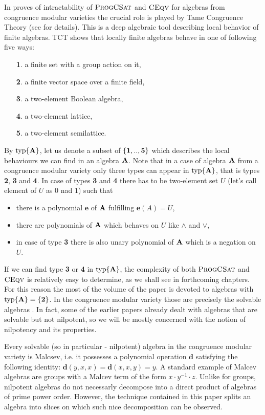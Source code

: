 \documentclass[11pt,a4paper]{amsart}
\newcommand{\m}[1]{{\uppercase {\bf{#1}}}}
\newcommand{\set}[1]{{\left\{ {#1} \right\} }}
\newcommand{\join}{\vee}
\newcommand{\meet}{\wedge}
\newcommand{\po}[1]{{\mathbf {#1}}}
\newcommand{\tn} [1]{{\bf {#1}}}
\newcommand{\typ}{{\rm typ}}
\newcommand{\typset}[1]{\typ\set{#1}}
\newcounter{note}
\newcommand{\gProblem}[2]{\ensuremath{\operatorname{\textup{\textsc{{#2}}}}
		\ifthenelse{\equal{#1}{}}{}{\!\left( {#1} \right)}}}
\newcommand{\ceqv}[1]{\gProblem{#1}{CEqv}}
\newcommand{\progcsat}[1]{\gProblem{#1}{ProgCSat}}
\begin{document}
In proves of intractability of \progcsat{} and \ceqv{} for algebras from congruence modular varieties the crucial role is played by Tame Congruence Theory (see \cite{hm} for details). This is a deep algebraic tool describing local behavior of finite algebras. TCT shows that locally  finite algebras behave in one of following five ways:
\begin{enumerate}
\item[{\tn 1}.]  a finite set with a group action on it,
\item[{\tn 2}.]  a finite vector space over a finite field,
\item[{\tn 3}.]  a two-element Boolean algebra,
\item[{\tn 4}.]  a two-element lattice,
\item[{\tn 5}.]  a two-element semilattice.
\end{enumerate}
By $\typset{\m A}$, let us denote a subset of $\{\tn 1,.., \tn 5\}$ which describes the local behaviours we can find in an algebra $\m A$. Note that in a case of algebra $\m A$ from a congruence modular variety only three types can appear in $\typset{\m A}$, that is types {\tn 2}, {\tn 3} and {\tn 4}. In case of types {\tn 3} and {\tn 4} there has to be two-element set $U$ (let's call element of $U$ as $0$ nad $1$) such that
\begin{itemize}
    \item there is a polynomial $\po e$ of $\m A$ fulfilling $\po e(A)=U$,
    \item there are polynomials of $\m A$ which behaves on $U$ like $\meet$ and $\join$,
    \item in case of type {\tn 3} there is also unary polynomial of $\m A$ which is a negation on $U$.
\end{itemize}

If we can find type {\tn 3} or {\tn 4} in $\typset{\m A}$, the complexity of both \progcsat{} and \ceqv{} is relatively easy to determine, as we shall see in forthcoming chapters. For this reason the most of the volume of the paper is devoted to algebras with $\typset{\m A} = \{\tn 2\}$. In the congruence modular variety those are precisely the solvable algebras \cite{fm, hm}. In fact, some of the earlier papers already dealt with algebras that are solvable but not nilpotent, so we will be mostly concerned with the notion of nilpotency and its properties.

Every solvable (so in particular - nilpotent) algebra in the congruence modular variety is Malcsev, i.e.\! it possesses a polynomial operation $\po d$ satisfying the following identity:
$\po d(y,x,x)=\po d(x,x,y)=y$. A standard example of Malcev algebras are groups with a Malcev term of the form $x \cdot y^{-1} \cdot z$. Unlike for groups, nilpotent algebras do not necessarly decompose into a direct product  of algebras of prime power order. However, the technique contained in this paper splits an algebra into slices on which such nice decomposition can be observed. 
\end{document}
